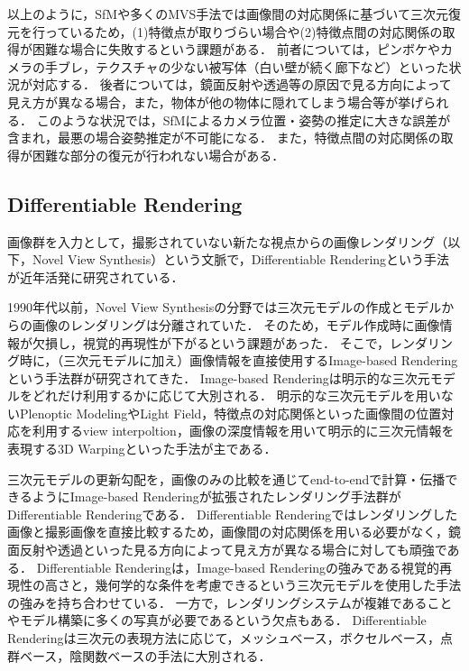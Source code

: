 以上のように，SfMや多くのMVS手法では画像間の対応関係に基づいて三次元復元を行っているため，(1)特徴点が取りづらい場合や(2)特徴点間の対応関係の取得が困難な場合に失敗するという課題がある．
前者については，ピンボケやカメラの手ブレ，テクスチャの少ない被写体（白い壁が続く廊下など）といった状況が対応する．
後者については，鏡面反射や透過等の原因で見る方向によって見え方が異なる場合，また，物体が他の物体に隠れてしまう場合等が挙げられる．
このような状況では，SfMによるカメラ位置・姿勢の推定に大きな誤差が含まれ，最悪の場合姿勢推定が不可能になる．
また，特徴点間の対応関係の取得が困難な部分の復元が行われない場合がある．\par

\subsection{Differentiable Rendering}\label{subsec:Differentiable Rendering}
画像群を入力として，撮影されていない新たな視点からの画像レンダリング（以下，Novel View Synthesis）という文脈で，Differentiable Renderingという手法が近年活発に研究されている．\par

1990年代以前，Novel View Synthesisの分野では三次元モデルの作成とモデルからの画像のレンダリングは分離されていた．
そのため，モデル作成時に画像情報が欠損し，視覚的再現性が下がるという課題があった．
そこで，レンダリング時に，（三次元モデルに加え）画像情報を直接使用するImage-based Renderingという手法群が研究されてきた．
Image-based Renderingは明示的な三次元モデルをどれだけ利用するかに応じて大別される\cite{image_based_rendering}．
明示的な三次元モデルを用いないPlenoptic Modeling\cite{pleptonic_modeling}やLight Field\cite{light_field}，特徴点の対応関係といった画像間の位置対応を利用するview interpoltion\cite{view_interpolation}，画像の深度情報を用いて明示的に三次元情報を表現する3D Warping\cite{3d_warping}といった手法が主である．\par

三次元モデルの更新勾配を，画像のみの比較を通じてend-to-endで計算・伝播できるようにImage-based Renderingが拡張されたレンダリング手法群がDifferentiable Renderingである．
Differentiable Renderingではレンダリングした画像と撮影画像を直接比較するため，画像間の対応関係を用いる必要がなく，鏡面反射や透過といった見る方向によって見え方が異なる場合に対しても頑強である．
Differentiable Renderingは，Image-based Renderingの強みである視覚的再現性の高さと，幾何学的な条件を考慮できるという三次元モデルを使用した手法の強みを持ち合わせている\cite{differentiable_rendering}．
一方で，レンダリングシステムが複雑であることやモデル構築に多くの写真が必要であるという欠点もある\cite{differentiable_rendering}．
Differentiable Renderingは三次元の表現方法に応じて，メッシュベース，ボクセルベース，点群ベース，陰関数ベースの手法に大別される．\par

